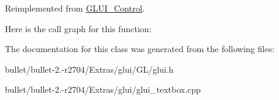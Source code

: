 Reimplemented from \hyperlink{class_g_l_u_i___control_a44fab5a8af3c58865bc2cd8bfd596af8}{G\+L\+U\+I\+\_\+\+Control}.



Here is the call graph for this function\+:




The documentation for this class was generated from the following files\+:\begin{DoxyCompactItemize}
\item 
bullet/bullet-\/2.-\/r2704/\+Extras/glui/\+G\+L/glui.\+h\item 
bullet/bullet-\/2.-\/r2704/\+Extras/glui/glui\+\_\+textbox.\+cpp\end{DoxyCompactItemize}
